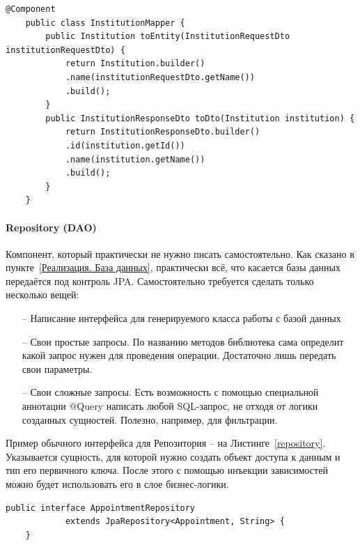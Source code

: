 \documentclass[a4paper,article]{article}
\begin{document}
\begin{sloppypar}
   \begin{lstlisting}[label=mapper,caption=Пример класса-маппера]
    @Component
    public class InstitutionMapper {
        public Institution toEntity(InstitutionRequestDto institutionRequestDto) {
            return Institution.builder()
            .name(institutionRequestDto.getName())
            .build();
        }
        public InstitutionResponseDto toDto(Institution institution) {
            return InstitutionResponseDto.builder()
            .id(institution.getId())
            .name(institution.getName())
            .build();
        }
    }
    \end{lstlisting}

    \paragraph{Repository (DAO)}\label{Реализация. Сервер. Repository}

    Компонент, который практически не нужно писать самостоятельно. Как сказано в пункте~\ref{Реализация. База данных}, практически всё, что касается базы данных передаётся под контроль JPA. Самостоятельно требуется сделать только несколько вещей:

    \begin{itemize}[nolistsep]
        \item[--] Написание интерфейса для генерируемого класса работы с базой данных
        \item[--] Свои простые запросы. По названию методов библиотека сама определит какой запрос нужен для проведения операции. Достаточно лишь передать свои параметры.
        \item[--] Свои сложные запросы. Есть возможность с помощью специальной аннотации @Query написать любой SQL-запрос, не отходя от логики созданных сущностей. Полезно, например, для фильтрации.
    \end{itemize}

    Пример обычного интерфейса для Репозитория -- на Листинге~\ref{repository}. Указывается сущность, для которой нужно создать объект доступа к данным и тип его первичного ключа. После этого с помощью инъекции зависимостей можно будет использовать его в слое бизнес-логики.

    \begin{lstlisting}[label=repository,caption=Пример интерфейса для репозитория]
    public interface AppointmentRepository
            extends JpaRepository<Appointment, String> {
    }
    \end{lstlisting}


\end{sloppypar}
\end{document}
